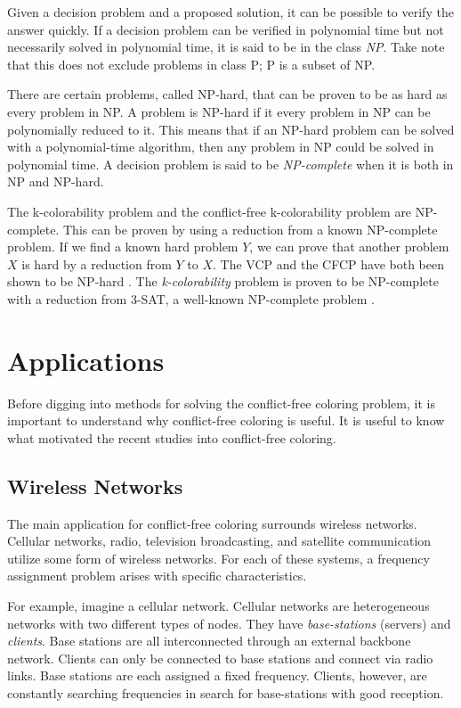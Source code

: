\documentclass{sig-alternate}
\begin{document}
Given a decision problem and a proposed solution, it can be possible to verify the answer quickly. If a decision problem can be verified in polynomial time but not necessarily solved in polynomial time, it is said to be in the class \emph{NP}. Take note that this does not exclude problems in class P; P is a subset of NP.

There are certain problems, called NP-hard, that can be proven to be as hard as every problem in NP. A problem is NP-hard if it every problem in NP can be polynomially reduced to it. This means that if an NP-hard problem can be solved with a polynomial-time algorithm, then any problem in NP could be solved in polynomial time. A decision problem is said to be \emph{NP-complete} when it is both in NP and NP-hard.

The k-colorability problem and the conflict-free k-colorability problem are NP-complete. This can be proven by using a reduction from a known NP-complete problem. If we find a known hard problem $Y$, we can prove that another problem $X$ is hard by a reduction from $Y$ to $X$. The VCP and the CFCP have both been shown to be NP-hard \cite{abel2017three,moret1998theory}. The \emph{k-colorability} problem is proven to be NP-complete with a reduction from 3-SAT, a well-known NP-complete problem \cite{sharma2012new}.

\section{Applications}
Before digging into methods for solving the conflict-free coloring problem, it is important to understand why conflict-free coloring is useful. It is useful to know what motivated the recent studies into conflict-free coloring.

\subsection{Wireless Networks}
The main application for conflict-free coloring surrounds wireless networks. Cellular networks, radio, television broadcasting, and satellite communication utilize some form of wireless networks. For each of these systems, a frequency assignment problem arises with specific characteristics.

For example, imagine a cellular network. Cellular networks are heterogeneous networks with two different types of nodes. They have \emph{base-stations} (servers) and \emph{clients}. Base stations are all interconnected through an external backbone network. Clients can only be connected to base stations and connect via radio links. Base stations are each assigned a fixed frequency. Clients, however, are constantly searching frequencies in search for base-stations with good reception.
\end{document}
